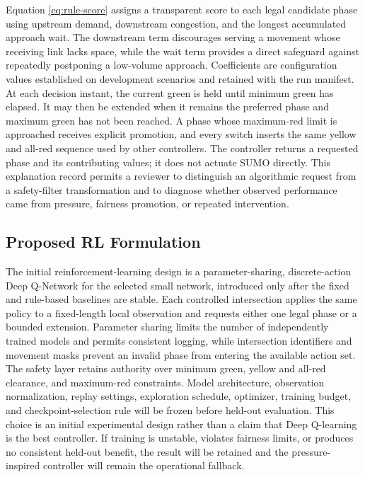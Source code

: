 Equation \ref{eq:rule-score} assigns a transparent score to each legal candidate phase using upstream demand, downstream congestion, and the longest accumulated approach wait. The downstream term discourages serving a movement whose receiving link lacks space, while the wait term provides a direct safeguard against repeatedly postponing a low-volume approach. Coefficients are configuration values established on development scenarios and retained with the run manifest. At each decision instant, the current green is held until minimum green has elapsed. It may then be extended when it remains the preferred phase and maximum green has not been reached. A phase whose maximum-red limit is approached receives explicit promotion, and every switch inserts the same yellow and all-red sequence used by other controllers. The controller returns a requested phase and its contributing values; it does not actuate SUMO directly. This explanation record permits a reviewer to distinguish an algorithmic request from a safety-filter transformation and to diagnose whether observed performance came from pressure, fairness promotion, or repeated intervention.

\subsection{Proposed RL Formulation}

The initial reinforcement-learning design is a parameter-sharing, discrete-action Deep Q-Network for the selected small network, introduced only after the fixed and rule-based baselines are stable. Each controlled intersection applies the same policy to a fixed-length local observation and requests either one legal phase or a bounded extension. Parameter sharing limits the number of independently trained models and permits consistent logging, while intersection identifiers and movement masks prevent an invalid phase from entering the available action set. The safety layer retains authority over minimum green, yellow and all-red clearance, and maximum-red constraints. Model architecture, observation normalization, replay settings, exploration schedule, optimizer, training budget, and checkpoint-selection rule will be frozen before held-out evaluation. This choice is an initial experimental design rather than a claim that Deep Q-learning is the best controller. If training is unstable, violates fairness limits, or produces no consistent held-out benefit, the result will be retained and the pressure-inspired controller will remain the operational fallback.

